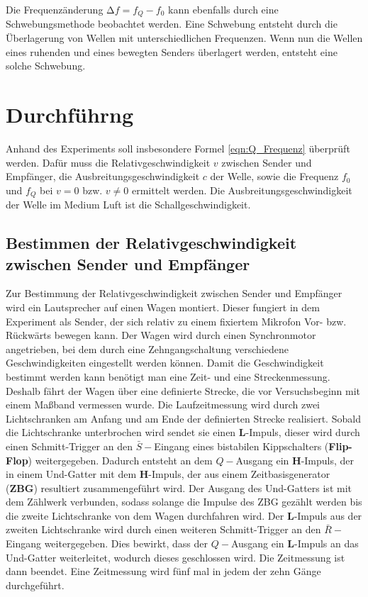 Die Frequenzänderung $\increment f = f_Q - f_0$ kann ebenfalls durch eine Schwebungsmethode beobachtet werden. Eine Schwebung entsteht durch die Überlagerung von Wellen mit unterschiedlichen Frequenzen. Wenn nun die Wellen eines ruhenden und eines bewegten Senders überlagert werden, entsteht eine solche Schwebung.
\section{Durchführng}
Anhand des Experiments soll insbesondere Formel \eqref{eqn:Q_Frequenz} überprüft werden. Dafür muss die Relativgeschwindigkeit $v$ zwischen Sender und Empfänger, die Ausbreitungsgeschwindigkeit $c$ der Welle, sowie die Frequenz $f_0$ und $f_Q$ bei $v = 0$ bzw. $v \neq 0$ ermittelt werden. Die Ausbreitungsgeschwindigkeit der Welle im Medium Luft ist die Schallgeschwindigkeit.
\subsection{Bestimmen der Relativgeschwindigkeit zwischen Sender und Empfänger}
Zur Bestimmung der Relativgeschwindigkeit zwischen Sender und Empfänger wird ein Lautsprecher auf einen Wagen montiert. Dieser fungiert in dem Experiment als Sender, der sich relativ zu einem fixiertem Mikrofon Vor- bzw. Rückwärts bewegen kann. Der Wagen wird durch einen Synchronmotor angetrieben, bei dem durch eine Zehngangschaltung verschiedene Geschwindigkeiten eingestellt werden können. Damit die Geschwindigkeit bestimmt werden kann benötigt man eine Zeit- und eine Streckenmessung. Deshalb fährt der Wagen über eine definierte Strecke, die vor Versuchsbeginn mit einem Maßband vermessen wurde. Die Laufzeitmessung wird durch zwei Lichtschranken am Anfang und am Ende der definierten Strecke realisiert. Sobald die Lichtschranke unterbrochen wird sendet sie einen \textbf{L}-Impuls, dieser wird durch einen Schmitt-Trigger an den $\bar{S}-$Eingang eines bistabilen Kippschalters (\textbf{Flip-Flop}) weitergegeben. Dadurch entsteht an dem $Q-$Ausgang ein \textbf{H}-Impuls, der in einem Und-Gatter mit dem \textbf{H}-Impuls, der aus einem Zeitbasisgenerator (\textbf{ZBG}) resultiert zusammengeführt wird. Der Ausgang des Und-Gatters ist mit dem Zählwerk verbunden, sodass solange die Impulse des ZBG gezählt werden bis die zweite Lichtschranke von dem Wagen durchfahren wird. Der \textbf{L}-Impuls aus der zweiten Lichtschranke wird durch einen weiteren Schmitt-Trigger an den $\bar{R}-$Eingang weitergegeben. Dies bewirkt, dass der $Q-$Ausgang ein \textbf{L}-Impuls an das Und-Gatter weiterleitet, wodurch dieses geschlossen wird. Die Zeitmessung ist dann beendet.
Eine Zeitmessung wird fünf mal in jedem der zehn Gänge durchgeführt.

